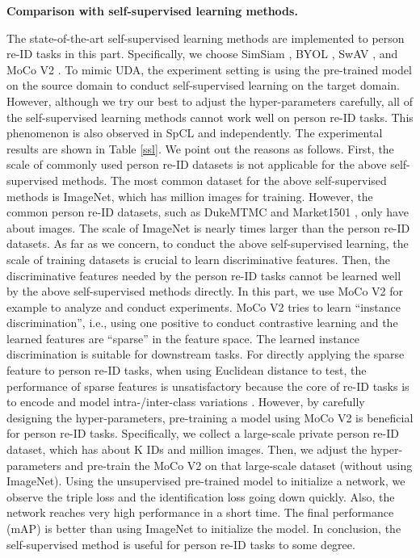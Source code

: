 \documentclass[journal]{IEEEtran}
\begin{document}
\textbf{Comparison with self-supervised learning methods.}\par 
The state-of-the-art self-supervised learning methods are implemented to person re-ID tasks in this part. Specifically, we choose SimSiam \cite{chen2021exploring}, BYOL \cite{NEURIPS2020_f3ada80d}, SwAV \cite{caron2020unsupervised}, and MoCo V2 \cite{he2020momentum}.  To mimic UDA, the experiment setting is using the pre-trained model on the source domain to conduct self-supervised learning on the target domain. However, although we try our best to adjust the hyper-parameters carefully, all of the self-supervised learning methods cannot work well on person re-ID tasks. This phenomenon is also observed in SpCL \cite{ge2020selfpaced} and \cite{DBLP:journals/corr/abs-2010-07608} independently.  The experimental results are shown in Table \ref{ssl}. We point out the reasons as follows. First, the scale of commonly used person re-ID datasets is not applicable for the above self-supervised methods. The most common dataset for the above self-supervised methods is ImageNet, which has  million images for training. However, the common person re-ID datasets, such as DukeMTMC \cite{zheng2017unlabeled} and Market1501 \cite{zheng2015scalable}, only have about  images. The scale of ImageNet is nearly  times larger than the person re-ID datasets. As far as we concern, to conduct the above self-supervised learning, the scale of training datasets is crucial to learn discriminative features.  Then, the discriminative features needed by the person re-ID tasks cannot be learned well by the above self-supervised methods directly. In this part, we use MoCo V2 for example to analyze and conduct experiments. MoCo V2 tries to learn ``instance discrimination'', i.e., using one positive to conduct contrastive learning and the learned features are ``sparse'' in the feature space. The learned instance discrimination is suitable for downstream tasks. For directly applying the sparse feature to person re-ID tasks, when using Euclidean distance to test, the performance of sparse features is unsatisfactory because the core of re-ID tasks is to encode and model intra-/inter-class variations \cite{ge2020selfpaced}. However, by carefully designing the hyper-parameters, pre-training a model using MoCo V2  \cite{he2020momentum} is beneficial for person re-ID tasks. Specifically, we collect a large-scale private person re-ID dataset, which has about K IDs and  million images. Then, we adjust the hyper-parameters and pre-train the MoCo V2  \cite{he2020momentum}  on that large-scale dataset (without using ImageNet). Using the unsupervised pre-trained model to initialize a network, we observe the triple loss and the identification loss going down quickly. Also, the network reaches very high performance in a short time. The final performance (mAP) is better than using ImageNet to initialize the model. In conclusion, the self-supervised method is useful for person re-ID tasks to some degree.
\end{document}
